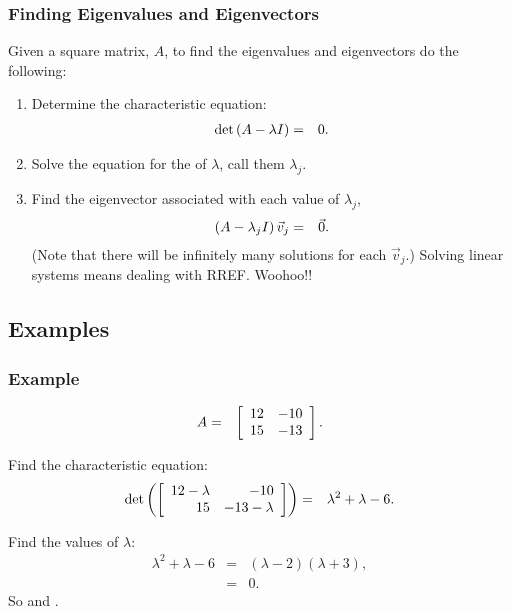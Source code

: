 \begin{frame}
  \frametitle{Finding Eigenvalues and Eigenvectors}

  Given a square matrix, $A$, to find the eigenvalues and eigenvectors do the following:
  \begin{enumerate}
  \item Determine the characteristic equation:
    \begin{eqnarray*}
      \det\left( A - \lambda I \right) & = & 0.
    \end{eqnarray*}
  \item Solve the equation for the  of $\lambda$,
    call them $\lambda_j$.
  \item Find the eigenvector associated with each value of $\lambda_j$,
    \begin{eqnarray*}
      \left( A - \lambda_j I \right) \vec{v}_j & = & \vec{0}.
    \end{eqnarray*}
    (Note that there will be infinitely many solutions for each
    $\vec{v}_j$.) Solving linear systems means dealing with
    RREF. Woohoo!!
  \end{enumerate}

\end{frame}

\subsection{Examples}

\begin{frame}
  \frametitle{Example}

  \begin{eqnarray*}
    A & = & \left[ \begin{array}{rr} 12 & -10 \\ 15 & -13 \end{array} \right].
  \end{eqnarray*}

  {
    Find the characteristic equation:
    \begin{eqnarray*}
      \det\left(\left[ \begin{array}{rr} 12-\lambda & -10 \\ 15 & -13-\lambda \end{array} \right]\right) & = & \lambda^2+\lambda-6.
    \end{eqnarray*}

    Find the values of $\lambda$:
    \begin{eqnarray*}
      \lambda^2+\lambda-6 & = & (\lambda-2)(\lambda+3), \\
      & = & 0.
    \end{eqnarray*}
    So  and .
  }

\end{frame}



